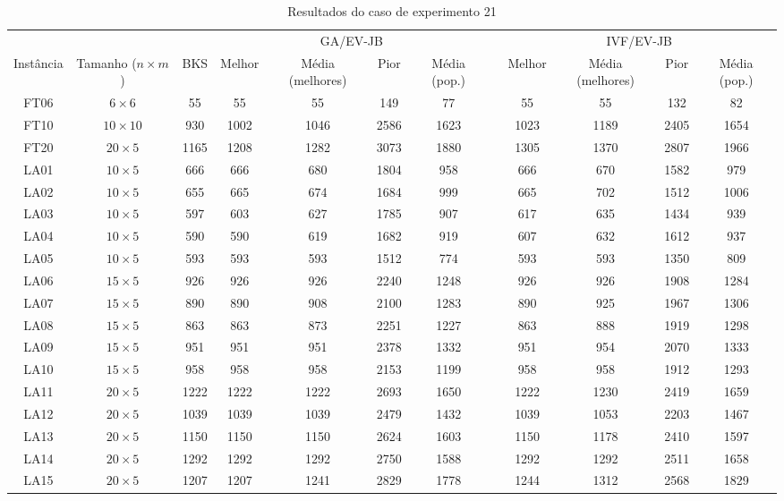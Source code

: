 \begin{sidewaystable}
\caption{Resultados do caso de experimento 21}
\centering
\label{experimento21}
\begin{tabular}{cccccccccccc}
\toprule
& & & \multicolumn{4}{c}{GA/EV-JB} & & \multicolumn{4}{c}{IVF/EV-JB} \\
\cmidrule(c){4-7}
\cmidrule(c){9-12}
Inst\^{a}ncia & Tamanho ($n \times m$) & BKS & Melhor & M\'{e}dia (melhores) & Pior & M\'{e}dia (pop.) & & Melhor & M\'{e}dia (melhores) & Pior & M\'{e}dia (pop.) \\
\midrule
FT06 & $6 \times 6$ & 55 & 55 & 55 & 149 & 77 & & 55 & 55 & 132 & 82 \\
FT10 & $10 \times 10$ & 930 & 1002 & 1046 & 2586 & 1623 & & 1023 & 1189 & 2405 & 1654 \\
FT20 & $20 \times 5$ & 1165 & 1208 & 1282 & 3073 & 1880 & & 1305 & 1370 & 2807 & 1966 \\
LA01 & $10 \times 5$ & 666 & 666 & 680 & 1804 & 958 & & 666 & 670 & 1582 & 979 \\
LA02 & $10 \times 5$ & 655 & 665 & 674 & 1684 & 999 & & 665 & 702 & 1512 & 1006 \\
LA03 & $10 \times 5$ & 597 & 603 & 627 & 1785 & 907 & & 617 & 635 & 1434 & 939 \\
LA04 & $10 \times 5$ & 590 & 590 & 619 & 1682 & 919 & & 607 & 632 & 1612 & 937 \\
LA05 & $10 \times 5$ & 593 & 593 & 593 & 1512 & 774 & & 593 & 593 & 1350 & 809 \\
LA06 & $15 \times 5$ & 926 & 926 & 926 & 2240 & 1248 & & 926 & 926 & 1908 & 1284 \\
LA07 & $15 \times 5$ & 890 & 890 & 908 & 2100 & 1283 & & 890 & 925 & 1967 & 1306 \\
LA08 & $15 \times 5$ & 863 & 863 & 873 & 2251 & 1227 & & 863 & 888 & 1919 & 1298 \\
LA09 & $15 \times 5$ & 951 & 951 & 951 & 2378 & 1332 & & 951 & 954 & 2070 & 1333 \\
LA10 & $15 \times 5$ & 958 & 958 & 958 & 2153 & 1199 & & 958 & 958 & 1912 & 1293 \\
LA11 & $20 \times 5$ & 1222 & 1222 & 1222 & 2693 & 1650 & & 1222 & 1230 & 2419 & 1659 \\
LA12 & $20 \times 5$ & 1039 & 1039 & 1039 & 2479 & 1432 & & 1039 & 1053 & 2203 & 1467 \\
LA13 & $20 \times 5$ & 1150 & 1150 & 1150 & 2624 & 1603 & & 1150 & 1178 & 2410 & 1597 \\
LA14 & $20 \times 5$ & 1292 & 1292 & 1292 & 2750 & 1588 & & 1292 & 1292 & 2511 & 1658 \\
LA15 & $20 \times 5$ & 1207 & 1207 & 1241 & 2829 & 1778 & & 1244 & 1312 & 2568 & 1829 \\
\bottomrule
\end{tabular}
\end{sidewaystable}
